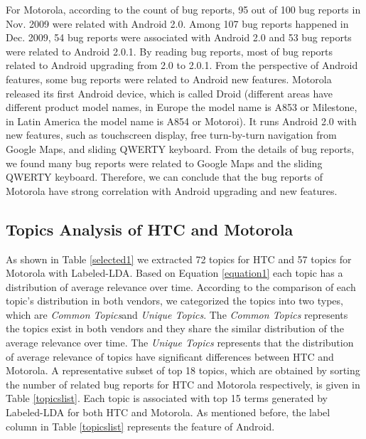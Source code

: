\documentclass[10pt, conference, compsocconf]{IEEEtran}
\begin{document}
For Motorola, according to the count of bug reports, 95 out of 100 bug reports in Nov. 2009 were related with Android 2.0. Among 107 bug reports happened in Dec. 2009, 54 bug reports were associated with Android 2.0 and 53 bug reports were related to Android 2.0.1. By reading bug reports, most of bug reports related to Android upgrading from 2.0 to 2.0.1. From the perspective of Android features, some bug reports were related to Android new features. Motorola released its first Android device, which is called Droid (different areas have different product model names, in Europe the model name is A853 or Milestone, in Latin America the model name is A854 or Motoroi). It runs Android 2.0 with new features, such as touchscreen display, free turn-by-turn navigation from Google Maps, and sliding QWERTY keyboard. From the details of bug reports, we found many bug reports were related to Google Maps and the sliding QWERTY keyboard. Therefore, we can conclude that the bug reports of Motorola have strong correlation with Android upgrading and new features.




\subsection{Topics Analysis of HTC and Motorola}
As shown in Table \ref{selected1} we extracted 72 topics for HTC and 57 topics for Motorola with Labeled-LDA.
Based on Equation \ref{equation1} each topic has a distribution of average relevance over time. According to the comparison of each topic's distribution in both vendors, we categorized the topics into two types, which are \textit{Common Topics}and \textit{Unique Topics}.
The \textit{Common Topics} represents the topics exist in both vendors and they share the similar distribution of the average relevance over time.
The \textit{Unique Topics} represents that the distribution of average relevance of topics have significant differences between HTC and Motorola.
A representative subset of top 18 topics, which are obtained by
sorting the number of related bug reports for HTC and Motorola
respectively, is given in Table \ref{topicslist}.
Each topic is associated with top 15 terms generated by Labeled-LDA for
both HTC and Motorola. As mentioned before, the label column in Table \ref{topicslist} represents the feature of Android.
\end{document}
